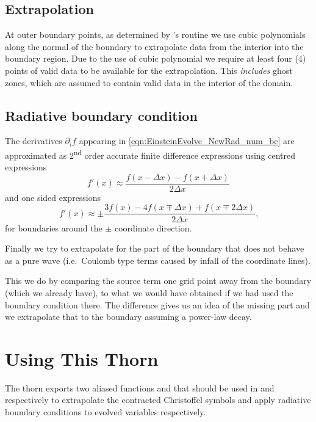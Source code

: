 \subsection{Extrapolation}
At outer boundary points, as determined by 's routine
 we use cubic polynomials along the
normal of the boundary to extrapolate data from the interior into the
boundary region. Due to the use of cubic polynomial we require at least
four (4) points of valid data to be available for the extrapolation.
This \emph{includes} ghost zones, which are assumed to contain valid
data in the interior of the domain.

\subsection{Radiative boundary condition}
The derivatives $\partial_i f$ appearing in
\eqref{eqn:EinsteinEvolve_NewRad_num_bc} are approximated as
2\textsuperscript{nd} order accurate finite difference expressions using
centred expressions
\begin{equation}
f'(x) \approx \frac{f(x-\Delta x) - f(x+\Delta x)}{2\Delta x}
\end{equation}
and one sided expressions
\begin{equation}
f'(x) \approx \pm\frac{3 f(x) - 4 f(x\mp\Delta x) + f(x\mp2\Delta
x)}{2\Delta x}\mbox{,}
\end{equation}
for boundaries around the $\pm$ coordinate direction.

Finally we try to extrapolate for the part of the boundary
that does not behave as a pure wave (i.e.\ Coulomb type
terms caused by infall of the coordinate lines).

This we do by comparing the source term one grid point
away from the boundary (which we already have), to what
we would have obtained if we had used the boundary
condition there.  The difference gives us an idea of the
missing part and we extrapolate that to the boundary
assuming a power-law decay.

\section{Using This Thorn}
The thorn exports two aliased functions  and
 that should be used in  and
 respectively to extrapolate the contracted
Christoffel symbols and apply radiative boundary conditions to evolved
variables respectively.

